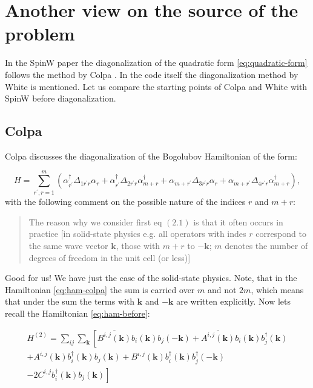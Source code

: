 \documentclass[a4paper,12pt]{article}
\begin{document}
    \section{Another view on the source of the problem}

        In the SpinW paper the diagonalization of the quadratic form \eqref{eq:quadratic-form} follows the method by Colpa \cite{colpa1978diagonalization}. 
        In the code itself the diagonalization method by White \cite{white1983quantum} is mentioned.
        Let us compare the starting points of Colpa and White with SpinW before diagonalization.
        
        \subsection{Colpa}
        
            Colpa discusses the diagonalization of the Bogolubov Hamiltonian of the form:

            \begin{equation}
                H = \sum_{r^{\prime}, r = 1}^m \left(\alpha_{r^{\prime}}^{\dag}\Delta_{1r^{\prime}r}\alpha_r +
                \alpha_{r^{\prime}}^{\dag}\Delta_{2r^{\prime}r}\alpha_{m+r}^{\dag} +
                \alpha_{m + r^{\prime}}\Delta_{3r^{\prime}r}\alpha_r +
                \alpha_{m + r^{\prime}}\Delta_{4r^{\prime}r}\alpha_{m + r}^{\dag}\right), \label{eq:ham-colpa}
            \end{equation}
            with the following comment on the possible nature of the indices $r$ and $m+r$:
            \begin{quote}
                The reason why we consider first eq $(2.1)$ is that it often occurs in practice 
                [in solid-state physics e.g. all operators with indes $r$ correspond to the same wave vector $\boldsymbol{k}$, 
                those with $m+r$ to $-\boldsymbol{k}$; $m$ denotes the number of degrees of freedom in the unit cell (or less)] 
            \end{quote}

            Good for us! We have just the case of the solid-state physics. Note, that in the Hamiltonian \eqref{eq:ham-colpa} the sum is carried over $m$ and not $2m$, 
            which means that under the sum the terms with $\boldsymbol{k}$ and $-\boldsymbol{k}$ are written explicitly. Now lets recall the Hamiltonian \eqref{eq:ham-before}:

            \begin{multline}
                H^{(2)} = \sum_{ij}\sum_{\boldsymbol{k}}\left[\overline{B^{i,j}(\boldsymbol{k})}b_{i}(\boldsymbol{k})b_{j}(-\boldsymbol{k}) +
                \overline{A^{i,j}(\boldsymbol{k})}b_{i}(\boldsymbol{k})b^{\dag}_{j}(\boldsymbol{k})\right. \\+ 
                A^{i,j}(\boldsymbol{k})b^{\dag}_{i}(\boldsymbol{k})b_{j}(\boldsymbol{k}) +
                B^{i,j}(\boldsymbol{k})b^{\dag}_{i}(\boldsymbol{k})b^{\dag}_{j}(-\boldsymbol{k}) \\-
                \left.2 C^{i,j}b^{\dag}_{i}(\boldsymbol{k})b_{j}(\boldsymbol{k})\right]
            \end{multline}
\end{document}

